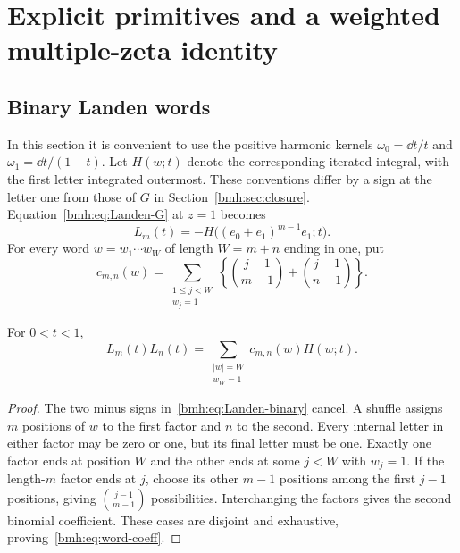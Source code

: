 \section{Explicit primitives and a weighted multiple-zeta identity}
\label{bmh:sec:words}

\subsection{Binary Landen words}
In this section it is convenient to use the positive harmonic kernels
$\omega_0=\dd t/t$ and $\omega_1=\dd t/(1-t)$. Let $H(w;t)$ denote the
corresponding iterated integral, with the first letter integrated
outermost. These conventions differ by a sign at the letter one from
those of $G$ in Section~\ref{bmh:sec:closure}. Equation~\eqref{bmh:eq:Landen-G}
at $z=1$ becomes
\begin{equation}\label{bmh:eq:Landen-binary}
 L_m(t)=-H\big((e_0+e_1)^{m-1}e_1;t\big).
\end{equation}
For every word $w=w_1\cdots w_W$ of length $W=m+n$ ending in one, put
\begin{equation}\label{bmh:eq:word-coeff}
 c_{m,n}(w)=\sum_{\substack{1\le j<W\\w_j=1}}
 \left\{\binom{j-1}{m-1}+\binom{j-1}{n-1}\right\}.
\end{equation}

\begin{lemma}\label{bmh:lem:shuffle}
For $0<t<1$,
\begin{equation}\label{bmh:eq:shuffle-product}
 L_m(t)L_n(t)=\sum_{\substack{|w|=W\\w_W=1}}c_{m,n}(w)H(w;t).
\end{equation}
\end{lemma}
\begin{proof}
The two minus signs in~\eqref{bmh:eq:Landen-binary} cancel. A shuffle
assigns $m$ positions of $w$ to the first factor and $n$ to the second.
Every internal letter in either factor may be zero or one, but its final
letter must be one. Exactly one factor ends at position $W$ and the
other ends at some $j<W$ with $w_j=1$. If the length-$m$ factor ends at
$j$, choose its other $m-1$ positions among the first $j-1$ positions,
giving $\binom{j-1}{m-1}$ possibilities. Interchanging the factors gives
the second binomial coefficient. These cases are disjoint and exhaustive,
proving~\eqref{bmh:eq:word-coeff}.
\end{proof}

